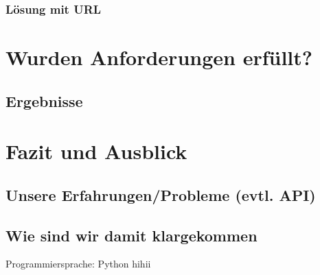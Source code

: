 \documentclass[a4paper,oneside,12pt]{report}
\begin{document}
			\subsection{Lösung mit URL}
	
	


	\chapter{Wurden Anforderungen erfüllt?}		
	
		\section{Ergebnisse}
		
	


	\chapter{Fazit und Ausblick}
	
		\section{Unsere Erfahrungen/Probleme (evtl. API)}

		\section{Wie sind wir damit klargekommen}


 
		
		Programmiersprache: Python
		hihii
				
\end{document}
